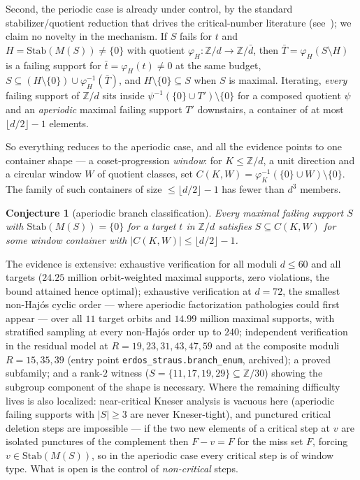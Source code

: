 \documentclass[11pt]{article}
\theoremstyle{plain}
\theoremstyle{remark}
\theoremstyle{plain}
\newtheorem{conjecture}[theorem]{Conjecture}
\numberwithin{equation}{section}
\begin{document}
Second, the periodic case is already under control, by the standard
stabilizer/quotient reduction that drives the critical-number
literature (see~\cite[Ch.~6]{Grynkiewicz}); we claim no novelty in the
mechanism. If $S$ fails for $t$ and $H = \mathrm{Stab}(M(S)) \ne \{0\}$
with quotient $\varphi_H \colon \mathbb{Z}/d \to \mathbb{Z}/\bar d$,
then $\bar T = \varphi_H(S \setminus H)$ is a failing support for
$\bar t = \varphi_H(t) \ne 0$ at the same budget,
$S \subseteq (H \setminus \{0\}) \cup \varphi_H^{-1}(\bar T)$, and
$H \setminus \{0\} \subseteq S$ when $S$ is maximal. Iterating,
\emph{every} failing support of $\mathbb{Z}/d$ sits inside
$\psi^{-1}(\{0\} \cup T') \setminus \{0\}$ for a composed quotient
$\psi$ and an \emph{aperiodic} maximal failing support $T'$
downstairs, a container of at most $\lfloor d/2 \rfloor - 1$ elements.

So everything reduces to the aperiodic case, and all the evidence
points to one container shape --- a coset-progression \emph{window}:
for $K \le \mathbb{Z}/d$, a unit direction and a circular window $W$ of
quotient classes, set
$C(K, W) = \varphi_K^{-1}(\{0\} \cup W) \setminus \{0\}$. The family of
such containers of size $\le \lfloor d/2 \rfloor - 1$ has fewer than
$d^3$ members.

\begin{conjecture}[aperiodic branch classification]\label{conj:A}
Every maximal failing support $S$ with
$\mathrm{Stab}(M(S)) = \{0\}$ for a target $t$ in $\mathbb{Z}/d$
satisfies $S \subseteq C(K, W)$ for some window container with
$|C(K, W)| \le \lfloor d/2 \rfloor - 1$.
\end{conjecture}

The evidence is extensive: exhaustive verification for all moduli
$d \le 60$ and all targets ($24.25$ million orbit-weighted maximal
supports, zero violations, the bound attained hence optimal);
exhaustive verification at $d = 72$, the smallest non-Haj\'os cyclic
order --- where aperiodic factorization pathologies could first appear
--- over all $11$ target orbits and $14.99$ million maximal supports,
with stratified sampling at every non-Haj\'os order up to $240$;
independent verification in the residual model at
$R = 19, 23, 31, 43, 47, 59$ and at the composite moduli
$R = 15, 35, 39$ (entry point \texttt{erdos\_straus.branch\_enum},
archived); a proved subfamily; and a rank-$2$ witness
($S = \{11, 17, 19, 29\} \subseteq \mathbb{Z}/30$) showing the subgroup
component of the shape is necessary. Where the remaining difficulty
lives is also localized: near-critical Kneser analysis is vacuous here
(aperiodic failing supports with $|S| \ge 3$ are never Kneser-tight),
and punctured critical deletion steps are impossible --- if the two
new elements of a critical step at $v$ are isolated punctures of the
complement then $F - v = F$ for the miss set $F$, forcing
$v \in \mathrm{Stab}(M(S))$, so in the aperiodic case every critical
step is of window type. What is open is the control of
\emph{non-critical} steps.
\end{document}
